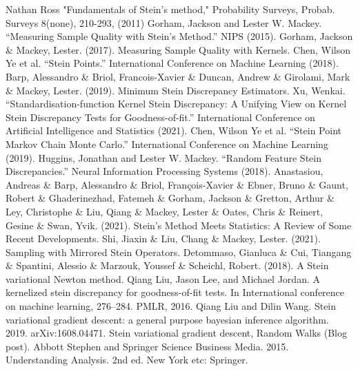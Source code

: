 \documentclass[12pt]{article}
\begin{document}
\begin{thebibliography}{20}
 Nathan Ross "Fundamentals of Stein’s method," Probability Surveys, Probab. Surveys 8(none), 210-293, (2011)
 Gorham, Jackson and Lester W. Mackey. “Measuring Sample Quality with Stein's Method.” NIPS (2015).
 Gorham, Jackson \& Mackey, Lester. (2017). Measuring Sample Quality with Kernels. 
 Chen, Wilson Ye et al. “Stein Points.” International Conference on Machine Learning (2018).
 Barp, Alessandro \& Briol, Francois-Xavier \& Duncan, Andrew \& Girolami, Mark \& Mackey, Lester. (2019). Minimum Stein Discrepancy Estimators. 
 Xu, Wenkai. “Standardisation-function Kernel Stein Discrepancy: A Unifying View on Kernel Stein Discrepancy Tests for Goodness-of-fit.” International Conference on Artificial Intelligence and Statistics (2021).
 Chen, Wilson Ye et al. “Stein Point Markov Chain Monte Carlo.” International Conference on Machine Learning (2019).
 Huggins, Jonathan and Lester W. Mackey. “Random Feature Stein Discrepancies.” Neural Information Processing Systems (2018).
 Anastasiou, Andreas \& Barp, Alessandro \& Briol, François-Xavier \& Ebner, Bruno \& Gaunt, Robert \& Ghaderinezhad, Fatemeh \& Gorham, Jackson \& Gretton, Arthur \& Ley, Christophe \& Liu, Qiang \& Mackey, Lester \& Oates, Chris \& Reinert, Gesine \& Swan, Yvik. (2021). Stein's Method Meets Statistics: A Review of Some Recent Developments. 
 Shi, Jiaxin \& Liu, Chang \& Mackey, Lester. (2021). Sampling with Mirrored Stein Operators. 
 Detommaso, Gianluca \& Cui, Tiangang \& Spantini, Alessio \& Marzouk, Youssef \& Scheichl, Robert. (2018). A Stein variational Newton method. 
 Qiang Liu, Jason Lee, and Michael Jordan. A kernelized stein discrepancy for goodness-of-fit tests. In International conference on machine learning, 276–284. PMLR, 2016.
 Qiang Liu and Dilin Wang. Stein variational gradient descent: a general purpose bayesian inference algorithm. 2019. arXiv:1608.04471.
 Stein variational gradient descent, Random Walks (Blog post).
 Abbott Stephen and Springer Science Business Media. 2015. Understanding Analysis. 2nd ed. New York etc: Springer.
\end{thebibliography}
\end{document}
